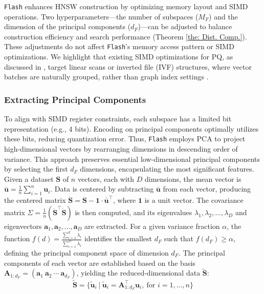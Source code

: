 \texttt{Flash} enhances HNSW construction by optimizing memory layout and SIMD operations. Two hyperparameters—the number of subspaces ($M_F$) and the dimension of the principal components ($d_F$)—can be adjusted to balance construction efficiency and search performance (Theorem \ref{the: Dist. Comp.}). These adjustments do not affect \texttt{Flash}'s memory access pattern or SIMD optimizations. We highlight that existing SIMD optimizations for PQ, as discussed in \cite{PQfast,QuickADC}, target linear scans or inverted file (IVF) structures, where vector batches are naturally grouped, rather than graph index settings \cite{RaBitQ}.

\subsubsection{\textbf{Extracting Principal Components}}
\label{subsubsec: extract principal components}
To align with SIMD register constraints, each subspace has a limited bit representation (e.g., 4 bits). Encoding on principal components optimally utilizes these bits, reducing quantization error.
Thus, \texttt{Flash} employs PCA to project high-dimensional vectors by rearranging dimensions in descending order of variance. This approach preserves essential low-dimensional principal components by selecting the first $d_{F}$ dimensions, encapsulating the most significant features.
Given a dataset $\boldsymbol{S}$ of $n$ vectors, each with $D$ dimensions, the mean vector is $\bar{\boldsymbol{u}} = \frac{1}{n} \sum_{i=1}^{n} \boldsymbol{u}_i$. Data is centered by subtracting $\bar{\boldsymbol{u}}$ from each vector, producing the centered matrix $\dot{\boldsymbol{S}} = \boldsymbol{S} - \boldsymbol{1} \cdot \bar{\boldsymbol{u}}^{\top}$, where $\boldsymbol{1}$ is a unit vector.
The covariance matrix $\Sigma = \frac{1}{n} (\dot{\boldsymbol{S}}^{\top} \dot{\boldsymbol{S}})$ is then computed, and its eigenvalues $\lambda_1, \lambda_2, \ldots, \lambda_{D}$ and eigenvectors $\boldsymbol{a}_1, \boldsymbol{a}_2, \ldots, \boldsymbol{a}_{D}$ are extracted. For a given variance fraction $\alpha$, the function $f(d) = \frac{\sum_{i=1}^{d} \lambda_i}{\sum_{i=1}^{D} \lambda_i}$ identifies the smallest $d_{F}$ such that $f(d_{F}) \geq \alpha$, defining the principal component space of dimension $d_{F}$. The principal components of each vector are established based on the basis $\boldsymbol{A}_{1:d_{F}} = (\boldsymbol{a}_1 \ \boldsymbol{a}_2 \ \cdots \ \boldsymbol{a}_{d_{F}})$, yielding the reduced-dimensional data $\widetilde{\boldsymbol{S}}$:
\begin{equation}
 \widetilde{\boldsymbol{S}} = \{ \tilde{\boldsymbol{u}}_i \ | \ \tilde{\boldsymbol{u}}_i = \mathbf{A}_{1:d_{F}}^{\top} \boldsymbol{u}_i, \ \text{for } i = 1, \ldots, n \}
\end{equation}


